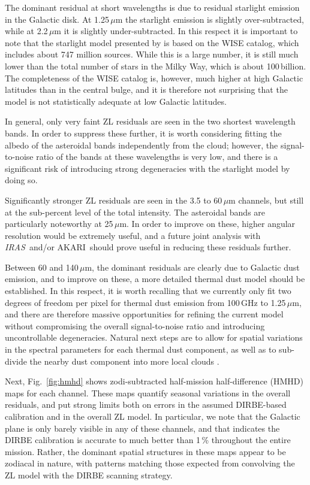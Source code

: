 \documentclass{aa}
\def\AKARI{\textrm{{AKARI}}}
\def\IRAS{\textit{{IRAS}}}
\begin{document}
The dominant residual at short wavelengths is due to
residual starlight emission in the Galactic disk. At 1.25$\,\mu$m the starlight emission is
slightly over-subtracted, while at 2.2\,$\mu$m it is slightly
under-subtracted. In this respect it is important to note that the
starlight model presented by \citet{CG02_04} is based on the WISE
catalog, which includes about 747 million sources. While this is a
large number, it is still much lower than the total number of stars in
the Milky Way, which is about 100\,billion. The completeness of the
WISE catalog is, however, much higher at high Galactic latitudes than
in the central bulge, and it is therefore not surprising that the
model is not statistically adequate at low Galactic latitudes. 
       
In general, only very faint ZL residuals are seen in the two
shortest wavelength bands. In order to suppress these further, it is
worth considering fitting the albedo of the asteroidal bands
independently from the cloud; however, the signal-to-noise ratio of
the bands at these wavelengths is very low, and there is a significant
risk of introducing strong degeneracies with the starlight model by
doing so.

Significantly stronger ZL residuals are seen in the 3.5 to 60$\,\mu$m
channels, but still at the sub-percent level of the total
intensity. The asteroidal bands are particularly noteworthy at
25$\,\mu$m. In order to improve on these, higher angular resolution
would be extremely useful, and a future joint analysis with \IRAS\
and/or \AKARI\ should prove useful in reducing these residuals further.

Between 60 and 140$\,\mu$m, the dominant residuals are clearly due to
Galactic dust emission, and to improve on these, a more detailed
thermal dust model should be established. In this respect, it is
worth recalling that we currently only fit two degrees of freedom per
pixel for thermal dust emission from 100\,GHz to 1.25$\,\mu$m, and
there are therefore massive opportunities for refining the current
model without compromising the overall signal-to-noise ratio and
introducing uncontrollable degeneracies. Natural next steps are to
allow for spatial variations in the spectral parameters for each
thermal dust component, as well as to sub-divide the nearby dust
component into more local clouds \citep{CG02_05}.

Next, Fig.~\ref{fig:hmhd} shows zodi-subtracted half-mission half-difference (HMHD)
maps for each channel. These maps quantify seasonal variations in the
overall residuals, and put strong limits both on errors in the assumed
DIRBE-based calibration and in the overall ZL model. In particular, we
note that the Galactic plane is only barely visible in any of these
channels, and that indicates the DIRBE calibration is accurate to much
better than 1\,\% throughout the entire mission. Rather, the dominant
spatial structures in these maps appear to be zodiacal in nature, with
patterns matching those expected from convolving the ZL model with the
DIRBE scanning strategy.
\end{document}
